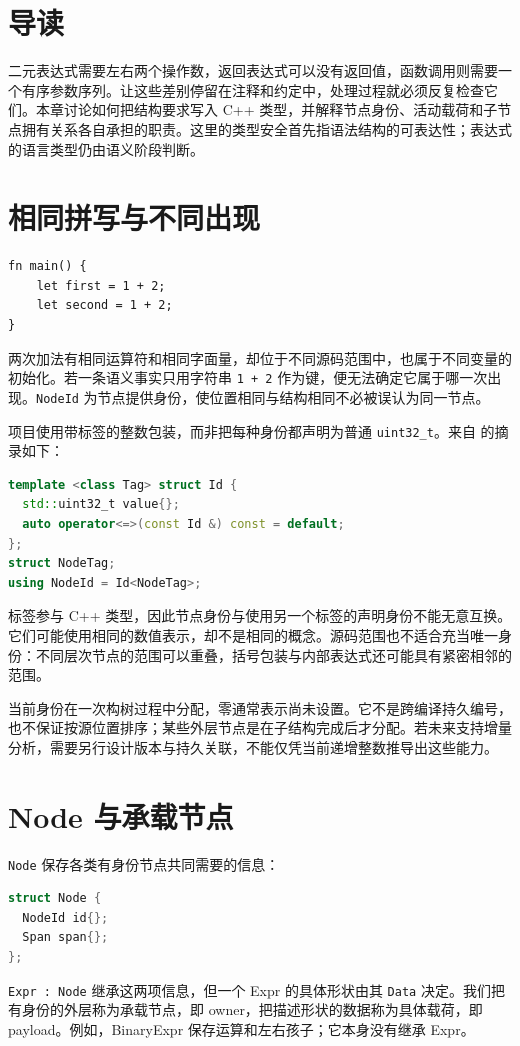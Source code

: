 \section*{导读}
二元表达式需要左右两个操作数，返回表达式可以没有返回值，函数调用则需要一个有序参数序列。让这些差别停留在注释和约定中，处理过程就必须反复检查它们。本章讨论如何把结构要求写入 C++ 类型，并解释节点身份、活动载荷和子节点拥有关系各自承担的职责。这里的类型安全首先指语法结构的可表达性；表达式的语言类型仍由语义阶段判断。

\section{相同拼写与不同出现}
\begin{lstlisting}[language=Rustless]
fn main() {
    let first = 1 + 2;
    let second = 1 + 2;
}
\end{lstlisting}
两次加法有相同运算符和相同字面量，却位于不同源码范围中，也属于不同变量的初始化。若一条语义事实只用字符串 \texttt{1 + 2} 作为键，便无法确定它属于哪一次出现。\texttt{NodeId} 为节点提供身份，使位置相同与结构相同不必被误认为同一节点。

项目使用带标签的整数包装，而非把每种身份都声明为普通 \texttt{uint32\_t}。来自  的摘录如下：
\begin{lstlisting}[language=C++]
template <class Tag> struct Id {
  std::uint32_t value{};
  auto operator<=>(const Id &) const = default;
};
struct NodeTag;
using NodeId = Id<NodeTag>;
\end{lstlisting}
标签参与 C++ 类型，因此节点身份与使用另一个标签的声明身份不能无意互换。它们可能使用相同的数值表示，却不是相同的概念。源码范围也不适合充当唯一身份：不同层次节点的范围可以重叠，括号包装与内部表达式还可能具有紧密相邻的范围。

当前身份在一次构树过程中分配，零通常表示尚未设置。它不是跨编译持久编号，也不保证按源位置排序；某些外层节点是在子结构完成后才分配。若未来支持增量分析，需要另行设计版本与持久关联，不能仅凭当前递增整数推导出这些能力。

\section{Node 与承载节点}
\texttt{Node} 保存各类有身份节点共同需要的信息：
\begin{lstlisting}[language=C++]
struct Node {
  NodeId id{};
  Span span{};
};
\end{lstlisting}
\texttt{Expr : Node} 继承这两项信息，但一个 Expr 的具体形状由其 \texttt{Data} 决定。我们把有身份的外层称为承载节点，即 owner，把描述形状的数据称为具体载荷，即 payload。例如，BinaryExpr 保存运算和左右孩子；它本身没有继承 Expr。

